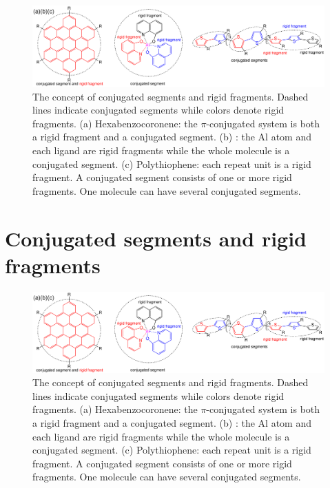 \begin{figure}
\includegraphics[width=\linewidth]{fig/fragment_segment}
\caption{The concept of conjugated segments and rigid fragments. Dashed lines indicate conjugated segments while colors denote rigid fragments. (a) Hexabenzocoronene: the $\pi$-conjugated system is both a rigid fragment and a conjugated segment. (b) \Alq: the Al atom and each ligand are rigid fragments while the whole molecule is a conjugated segment. (c) Polythiophene: each repeat unit is a rigid fragment. A conjugated segment consists of one or more rigid fragments. One molecule can have several conjugated segments.}
\label{fig:segment}
\end{figure}

\section{Conjugated segments and rigid fragments}
\label{sec:segments}

\begin{figure}
\includegraphics[width=\linewidth]{fig/fragment_segment}
\caption{The concept of conjugated segments and rigid fragments. Dashed lines indicate conjugated segments while colors denote rigid fragments. (a) Hexabenzocoronene: the $\pi$-conjugated system is both a rigid fragment and a conjugated segment. (b) \Alq: the Al atom and each ligand are rigid fragments while the whole molecule is a conjugated segment. (c) Polythiophene: each repeat unit is a rigid fragment. A conjugated segment consists of one or more rigid fragments. One molecule can have several conjugated segments.}
\label{fig:segment}
\end{figure}

